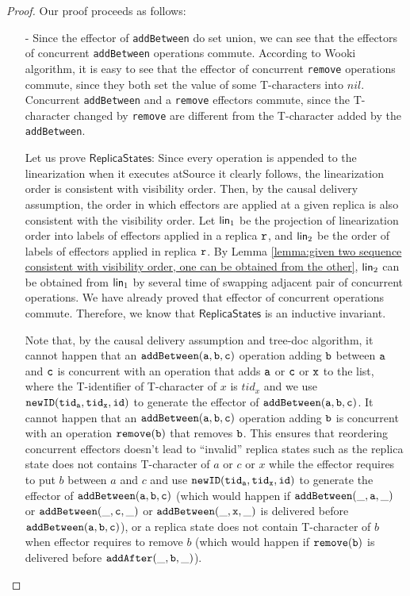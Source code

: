 \begin {proof}
Our proof proceeds as follows:

\begin{itemize}
\setlength{\itemsep}{0.5pt}
\item[-] Since the effector of {\tt addBetween} do set union, we can see that the effectors of concurrent {\tt addBetween} operations commute. According to Wooki algorithm, it is easy to see that the effector of concurrent {\tt remove} operations commute, since they both set the value of some T-characters into $nil$. Concurrent {\tt addBetween} and a {\tt remove} effectors commute, since the T-character changed by {\tt remove} are different from the T-character added by the {\tt addBetween}.

    Let us prove $\mathsf{ReplicaStates}$: Since every operation is appended to the linearization when it executes atSource it clearly follows, the linearization order is consistent with visibility order. Then, by the causal delivery assumption, the order in which effectors are applied at a given replica is also consistent with the visibility order. Let $\mathsf{lin}_1$ be the projection of linearization order into labels of effectors applied in a replica $\mathtt{r}$, and $\mathsf{lin}_2$ be the order of labels of effectors applied in replica $\mathtt{r}$. By Lemma \ref{lemma:given two sequence consistent with visibility order, one can be obtained from the other}, $\mathsf{lin}_2$ can be obtained from $\mathsf{lin}_1$ by several time of swapping adjacent pair of concurrent operations. We have already proved that effector of concurrent operations commute. Therefore, we know that $\mathsf{ReplicaStates}$ is an inductive invariant.

    Note that, by the causal delivery assumption and tree-doc algorithm, it cannot happen that an $\alabelshort[{\tt addBetween}]{a,b,c}$ operation adding ${\tt b}$ between ${\tt a}$ and ${\tt c}$ is concurrent with an operation that adds ${\tt a}$ or ${\tt c}$ or ${\tt x}$ to the list, where the T-identifier of T-character of $x$ is $tid_x$ and we use $\alabelshort[{\tt newID}]{tid_a,tid_x,id}$ to generate the effector of $\alabelshort[{\tt addBetween}]{a,b,c}$. It cannot happen that an $\alabelshort[{\tt addBetween}]{a,b,c}$ operation adding ${\tt b}$ is concurrent with an operation $\alabelshort[{\tt remove}]{b}$ that removes ${\tt b}$. This ensures that reordering concurrent effectors doesn't lead to ``invalid'' replica states such as the replica state does not contains T-character of $a$ or $c$ or $x$ while the effector requires to put $b$ between $a$ and $c$ and use $\alabelshort[{\tt newID}]{tid_a,tid_x,id}$ to generate the effector of $\alabelshort[{\tt addBetween}]{a,b,c}$ (which would happen if $\alabelshort[{\tt addBetween}]{\_,a,\_}$ or $\alabelshort[{\tt addBetween}]{\_,c,\_}$ or $\alabelshort[{\tt addBetween}]{\_,x,\_}$ is delivered before $\alabelshort[{\tt addBetween}]{a,b,c}$), or a replica state does not contain T-character of $b$ when effector requires to remove $b$ (which would happen if $\alabelshort[{\tt remove}]{b}$ is delivered before $\alabelshort[{\tt addAfter}]{\_,b,\_}$).


\end{itemize}
\end{proof}
